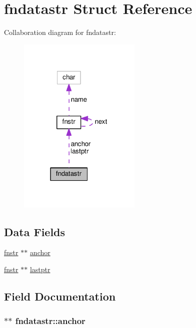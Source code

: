 \hypertarget{structfndatastr}{}\section{fndatastr Struct Reference}
\label{structfndatastr}


Collaboration diagram for fndatastr\+:
\nopagebreak
\begin{figure}[H]
\begin{center}
\leavevmode
\includegraphics[width=166pt]{structfndatastr__coll__graph}
\end{center}
\end{figure}
\subsection*{Data Fields}
\begin{DoxyCompactItemize}
\item 
\hyperlink{structfnstr}{fnstr} $\ast$$\ast$ \hyperlink{structfndatastr_a001431f53f35b20e7f99840b859c847d}{anchor}
\item 
\hyperlink{structfnstr}{fnstr} $\ast$$\ast$ \hyperlink{structfndatastr_afe11c7a51bae05edde3756d1f569fec5}{lastptr}
\end{DoxyCompactItemize}


\subsection{Field Documentation}
\subsubsection[{\texorpdfstring{anchor}{anchor}}]{$\ast$$\ast$ fndatastr\+::anchor}\hypertarget{structfndatastr_a001431f53f35b20e7f99840b859c847d}{}\label{structfndatastr_a001431f53f35b20e7f99840b859c847d}
